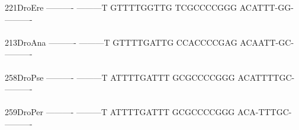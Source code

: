 \documentclass[11pt,twoside,reqno,a4paper]{article}
\begin{document}
{221\hspace*{1\charwidth}DroEre	----------	---------T	GTTTTGGTTG	TCGCCCCGGG	ACATTT-GG-	----------	\\
\hspace*{4\charwidth}\hspace*{7\charwidth}\hspace*{1\charwidth}\hspace*{1\charwidth}\hspace*{1\charwidth}\hspace*{1\charwidth}\hspace*{1\charwidth}\hspace*{1\charwidth}\\
213\hspace*{1\charwidth}DroAna	----------	---------T	GTTTTGATTG	CCACCCCGAG	ACAATT-GC-	----------	\\
\hspace*{4\charwidth}\hspace*{7\charwidth}\hspace*{1\charwidth}\hspace*{1\charwidth}\hspace*{1\charwidth}\hspace*{1\charwidth}\hspace*{1\charwidth}\hspace*{1\charwidth}\\
258\hspace*{1\charwidth}DroPse	----------	---------T	ATTTTGATTT	GCGCCCCGGG	ACATTTTGC-	----------	\\
\hspace*{4\charwidth}\hspace*{7\charwidth}\hspace*{1\charwidth}\hspace*{1\charwidth}\hspace*{1\charwidth}\hspace*{1\charwidth}\hspace*{1\charwidth}\hspace*{1\charwidth}\\
259\hspace*{1\charwidth}DroPer	----------	---------T	ATTTTGATTT	GCGCCCCGGG	ACA-TTTGC-	----------	\\
\hspace*{4\charwidth}\hspace*{7\charwidth}\hspace*{1\charwidth}\hspace*{1\charwidth}\hspace*{1\charwidth}\hspace*{1\charwidth}\hspace*{1\charwidth}\hspace*{1\charwidth}\\
}
\end{document}
